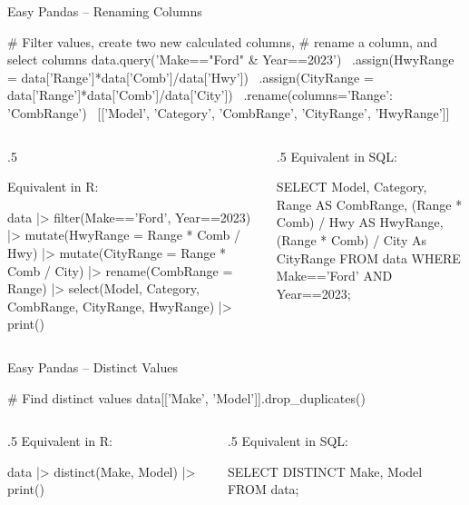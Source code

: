 \documentclass[ignorenonframetext,xcolor=x11names]{beamer}
\begin{document}
\begin{frame}[label=full,fragile]{Easy Pandas -- Renaming Columns}

\begin{pythoncode}
# Filter values, create two new calculated columns,
# rename a column, and select columns
data.query('Make=="Ford" & Year==2023') \
  .assign(HwyRange = data['Range']*data['Comb']/data['Hwy']) \
  .assign(CityRange = data['Range']*data['Comb']/data['City']) \
  .rename(columns={'Range': 'CombRange'}) \
  [['Model', 'Category', 'CombRange', 'CityRange', 'HwyRange']]
\end{pythoncode}

\vspace{\baselineskip}

\begin{columns}
\begin{column}{.5\textwidth}

Equivalent in R:
\begin{Rcode}
data |> 
  filter(Make=='Ford', 
         Year==2023) |> 
  mutate(HwyRange = 
     Range * Comb / Hwy) |>
  mutate(CityRange = 
     Range * Comb / City) |>
  rename(CombRange = Range) |>
  select(Model, Category, 
         CombRange, CityRange, 
         HwyRange) |>
  print()
\end{Rcode}
\end{column}
\begin{column}{.5\textwidth}
Equivalent in SQL:
\begin{sqlcode}
SELECT Model, Category, 
      Range AS CombRange,
      (Range * Comb) / Hwy 
          AS HwyRange, 
      (Range * Comb) / City 
          As CityRange
   FROM data 
   WHERE Make=='Ford' AND 
         Year==2023;
\end{sqlcode}
\end{column}
\end{columns}
\end{frame}

\begin{frame}[label=full,fragile]{Easy Pandas -- Distinct Values}
\begin{pythoncode}
# Find distinct values
data[['Make', 'Model']].drop_duplicates()
\end{pythoncode}

\vspace{\baselineskip}
\begin{columns}
\begin{column}{.5\textwidth}
Equivalent in R:

\begin{Rcode}
data |> 
  distinct(Make, Model) |>
  print()
\end{Rcode}
\end{column}
\begin{column}{.5\textwidth}
Equivalent in SQL:

\begin{sqlcode}
SELECT DISTINCT Make, Model 
  FROM data;
\end{sqlcode}
\end{column}
\end{columns}
\end{frame}
\end{document}
